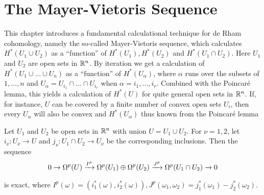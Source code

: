 \chapter{The Mayer-Vietoris Sequence}
This chapter introduces a fundamental calculational technique for de Rham
cohomology, namely the so-called Mayer-Vietoris sequence, which calculates
$H^*(U_1\cup U_2)$ as a ``function'' of $H^*(U_1), H^*(U_2)$ and $H^*(U_1\cap U_2)$. Here $U_1$ and
$U_2$ are open sets in ${\mathbb{R}}^n$. By iteration we get a calculation of $H^*(U_1\cup\ldots\cup U_n)$ as
a ``function'' of $H^*(U_\alpha)$, where $\alpha$ runs over the subsets of ${1,\ldots, n}$ and 
$U_\alpha=U_{i_1}\cap\ldots\cap U_{i_r}$ when $\alpha = {i_1,\ldots, i_r }$. Combined with the Poincar\'e lemma, this
yields a  calculation of $H^*(U)$ for quite general open sets in ${\mathbb{R}}^n$. If, for
instance, $U$ can be covered by a finite number of convex open sets $U_i$, then every
$U_\alpha$ will also be convex and $H^*(U_\alpha)$ thus known from the Poincar\'e lemma


\begin{theorem}\label{theorem:5-1}
Let $U_1$ and $U_2$ be open sets in ${\mathbb{R}}^n$ with union $U = U_1\cup U_2$. For $\nu = 1, 2$, let 
$i_\nu: U_\nu\to U$ and $j_\nu:U_1\cap U_2\to U_\nu$ be the corresponding inclusions. Then the sequence
\begin{align*}
  0\xra[]\Omega^p(U)\xra[I^p]\Omega^p(U_1)\oplus\Omega^p(U_2)\xra[J^p]\Omega^p(U_1\cap U_2)\xra[]0
\end{align*}

is exact, where $I^p(\omega) = (i^*_1(\omega), i^*_2(\omega)), J^p(\omega_1, \omega_2) = j^*_1(\omega_1) - j^*_2(\omega_2)$.
\end{theorem}

